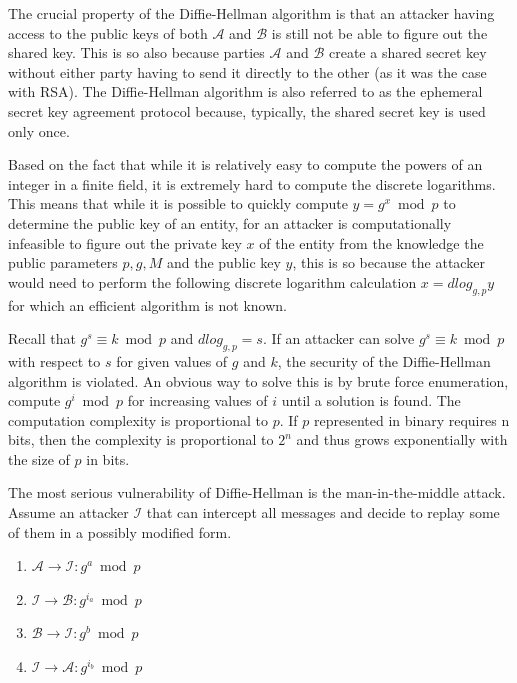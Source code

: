 The crucial property of the Diffie-Hellman algorithm is that an attacker having access to the public keys of both $\mathcal{A}$ and $\mathcal{B}$ is still not be able to figure out the shared key. This is so also because parties $\mathcal{A}$ and $\mathcal{B}$ create a shared secret key without either party having to send it directly to the other (as it was the case with RSA). The Diffie-Hellman algorithm is also referred to as the ephemeral secret key agreement protocol because, typically, the shared secret key is used only once.


Based on the fact that while it is relatively easy to compute the powers of an integer in a finite field, it is extremely hard to compute the discrete logarithms. This means that while it is possible to quickly compute $y = g^x \bmod p$ to determine the public key of an entity, for an attacker is computationally infeasible to figure out the private key $x$ of the entity from the knowledge the public parameters $p, g, M$ and the public key $y$, this is so because the attacker would need to perform the following discrete logarithm calculation $x = dlog_{g,p} y$ for which an efficient algorithm is not known.

Recall that $g^s \equiv k \bmod p$ and $dlog_{g,p} = s$. If an attacker can solve $g^s \equiv k \bmod p$ with respect to $s$ for given values of $g$ and $k$, the security of the Diffie-Hellman algorithm is violated. An obvious way to solve this is by brute force enumeration, compute $g^i \bmod p$ for increasing values of $i$ until a solution is found. The computation complexity is proportional to $p$. If $p$ represented in binary requires n bits, then the complexity is proportional to $2^n$ and thus grows exponentially with the size of $p$ in bits.


The most serious vulnerability of Diffie-Hellman is the man-in-the-middle attack. Assume an attacker $\mathcal{I}$ that can intercept all messages and decide to replay some of them in a possibly modified form.


\begin{enumerate}
	\item $\mathcal{A} \rightarrow \mathcal{I}: g^a \bmod{p}$
	\item $\mathcal{I} \rightarrow \mathcal{B}: g^{i_a} \bmod{p}$
	\item $\mathcal{B} \rightarrow \mathcal{I}: g^{b} \bmod{p}$
	\item $\mathcal{I} \rightarrow \mathcal{A}: g^{i_b} \bmod{p}$
\end{enumerate}

